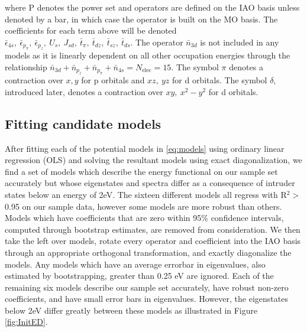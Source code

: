 \documentclass{article}
\begin{document}
where P denotes the power set and operators are defined on the IAO basis unless denoted by a bar, in which case the operator is built on the MO basis. The coefficients for each term above will be denoted $\bar{\epsilon}_{4s},\ \bar{\epsilon}_{p_\pi},\ \bar{\epsilon}_{p_z},\ U_s,\ J_{sd},\ \bar{t}_\pi,\ \bar{t}_{dz},\ \bar{t}_{sz},\ \bar{t}_{ds}$. The operator $\bar{n}_{3d}$ is not included in any models as it is linearly dependent on all other occupation energies through the relationship $\bar{n}_{3d} + \bar{n}_{p_z} + \bar{n}_{p_\pi} + \bar{n}_{4s} = N_\text{elec} = \text{15}$. The symbol $\pi$ denotes a contraction over $x, y$ for p orbitals and $xz,\ yz$ for d orbitals. The symbol $\delta$, introduced later, denotes a contraction over $xy,\ x^2-y^2$ for d orbitals.

\pagebreak
\subsection{Fitting candidate models}
After fitting each of the potential models in \eqref{eq:models} using ordinary linear regression (OLS) and solving the resultant models using exact diagonalization, we find a set of models which describe the energy functional on our sample set accurately but whose eigenstates and spectra differ as a consequence of intruder states below an energy of 2eV. 
The sixteen different models all regress with R$^2 >$ 0.95 on our sample data, however some models are more robust than others. 
Models which have coefficients that are zero within 95\% confidence intervals, computed through bootstrap estimates, are removed from consideration.
We then take the left over models, rotate every operator and coefficient into the IAO basis through an appropriate orthogonal transformation, and exactly diagonalize the models.
Any models which have an average errorbar in eigenvalues, also estimated by bootstrapping, greater than 0.25 eV are ignored.
Each of the remaining six models describe our sample set accurately, have robust non-zero coefficients, and have small error bars in eigenvalues.
However, the eigenstates below 2eV differ greatly between these models as illustrated in Figure \ref{fig:InitED}.
\end{document}
